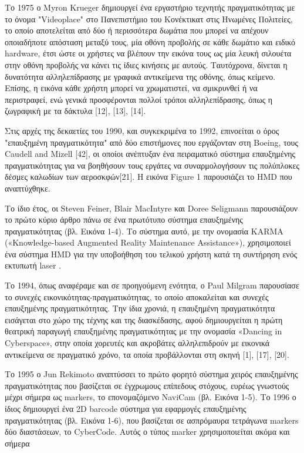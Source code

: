  

Το 1975 ο Myron Krueger δημιουργεί ένα εργαστήριο τεχνητής πραγματικότητας με το όνομα "Videoplace" στο Πανεπιστήμιο του Κονέκτικατ στις Ηνωμένες Πολιτείες, το οποίο αποτελείται από δύο ή περισσότερα δωμάτια που μπορεί να απέχουν οποιαδήποτε απόσταση μεταξύ τους, μία οθόνη προβολής σε κάθε δωμάτιο και ειδικό hardware, έτσι ώστε οι χρήστες να βλέπουν την εικόνα τους ως μία λευκή σιλουέτα στην οθόνη προβολής να κάνει τις ίδιες κινήσεις με αυτούς. Ταυτόχρονα, δίνεται η δυνατότητα αλληλεπίδρασης με γραφικά αντικείμενα της οθόνης, όπως κείμενο. Επίσης, η εικόνα κάθε χρήστη μπορεί να χρωματιστεί, να σμικρυνθεί ή να περιστραφεί, ενώ γενικά προσφέρονται πολλοί τρόποι αλληλεπίδρασης, όπως η ζωγραφική με τα δάκτυλα [12], [13], [14]. 


Στις αρχές της δεκαετίες του 1990, και συγκεκριμένα το 1992, επινοείται ο όρος "επαυξημένη πραγματικότητα" από δύο επιστήμονες που εργάζονταν στη Boeing, τους Caudell and Mizell [42], οι οποίοι ανέπτυξαν ένα πειραματικό σύστημα επαυξημένης πραγματικότητας για να βοηθήσουν τους εργάτες να συναρμολογήσουν τις πολύπλοκες δέσμες καλωδίων των αεροσκφών[21]. Η εικόνα Figure 1 παρουσιάζει το HMD που αναπτύχθηκε.


Το ίδιο έτος, οι Steven Feiner, Blair MacIntyre και Doree Seligmann παρουσιάζουν το πρώτο κύριο άρθρο πάνω σε ένα πρωτότυπο σύστημα επαυξημένης πραγματικότητας (βλ. Εικόνα 1-4). Tο σύστημα αυτό, με την ονομασία KARMA («Knowledge-based Augmented Reality Maintenance Assistance»), χρησιμοποιεί ένα σύστημα HMD για την υποβοήθηση του τελικού χρήστη κατά τη συντήρηση ενός εκτυπωτή laser \cite{feiner1993knowledge}.



Το 1994, όπως αναφέραμε και σε προηγούμενη ενότητα, ο Paul Milgram παρουσίασε το συνεχές εικονικότητας-πραγματικότητας\cite{milgram1994taxonomy}, το οποίο αποκαλείται και συνεχές επαυξημένης πραγματικότητας. Την ίδια χρονιά, η επαυξημένη πραγματικότητα εισάγεται στο χώρο της τέχνης και της διασκέδασης, αφού δημιουργείται η πρώτη θεατρική παραγωγή επαυξημένης πραγματικότητας με την ονομασία «Dancing in Cyberspace», στην οποία χορευτές και ακροβάτες αλληλεπιδρούν με εικονικά αντικείμενα σε πραγματικό χρόνο, τα οποία προβάλλονται στη σκηνή [1], [17], [20]. 



Το 1995 ο Jun Rekimoto αναπτύσσει το πρώτο φορητό σύστημα χειρός επαυξημένης πραγματικότητας που βασίζεται σε έγχρωμους επίπεδους στόχους, ευρέως γνωστούς μέχρι σήμερα ως markers, το επονομαζόμενο NaviCam (βλ. Εικόνα 1-5). Το 1996 ο ίδιος δημιουργεί ένα 2D barcode σύστημα για εφαρμογές επαυξημένης πραγματικότητας (βλ. Εικόνα 1-6), που βασίζεται σε ασπρόμαυρα τετράγωνα markers δύο διαστάσεων, το CyberCode. Αυτός ο τύπος marker χρησιμοποιείται ακόμα και σήμερα \cite{arth2015history}


